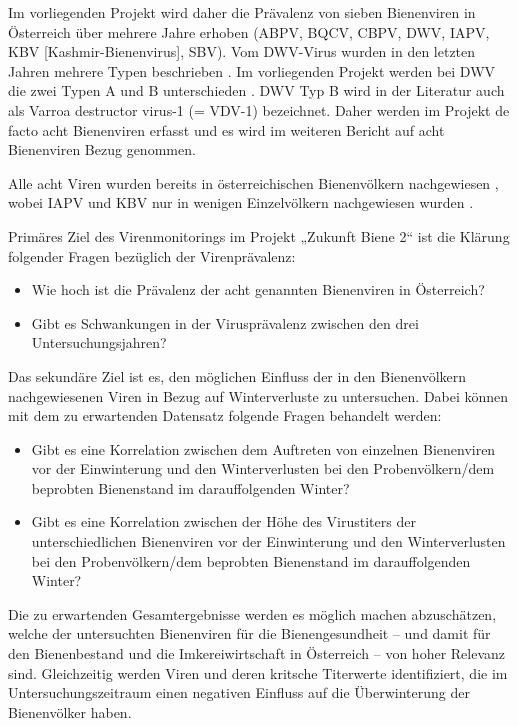 Im vorliegenden Projekt wird daher die Prävalenz von sieben Bienenviren in Österreich über mehrere Jahre erhoben (ABPV, BQCV, CBPV, DWV, IAPV, KBV [Kashmir-Bienenvirus], SBV). Vom DWV-Virus wurden in den letzten Jahren mehrere Typen beschrieben \citep{martin2012,mordecai2016}. Im vorliegenden Projekt werden bei DWV die zwei Typen A und B unterschieden \citep{martin2012}. DWV Typ B wird in der Literatur auch als Varroa destructor virus-1 (= VDV-1) bezeichnet. Daher werden im Projekt de facto acht Bienenviren erfasst und es wird im weiteren Bericht auf acht Bienenviren Bezug genommen.

Alle acht Viren wurden bereits in österreichischen Bienenvölkern nachgewiesen \citep{berenyi2006,girsch2012,köglberger2009,morawetz2018}, wobei IAPV und KBV nur in wenigen Einzelvölkern nachgewiesen wurden \citep{girsch2012}. 

Primäres Ziel des Virenmonitorings im Projekt „Zukunft Biene 2“ ist die Klärung folgender Fragen bezüglich der Virenprävalenz: 

\begin{itemize}
    \item Wie hoch ist die Prävalenz der acht genannten Bienenviren in Österreich? 
    \item Gibt es Schwankungen in der Virusprävalenz zwischen den drei Untersuchungsjahren?
\end{itemize}

Das sekundäre Ziel ist es, den möglichen Einfluss der in den Bienenvölkern nachgewiesenen Viren in Bezug auf Winterverluste zu untersuchen. Dabei können mit dem zu erwartenden Datensatz folgende Fragen behandelt werden: 

\begin{itemize}
    \item Gibt es eine Korrelation zwischen dem Auftreten von einzelnen Bienenviren vor der Einwinterung und den Winterverlusten bei den Probenvölkern/dem beprobten Bienenstand im darauffolgenden Winter? 
    \item Gibt es eine Korrelation zwischen der Höhe des Virustiters der unterschiedlichen Bienenviren vor der Einwinterung und den Winterverlusten bei den Probenvölkern/dem beprobten Bienenstand im darauffolgenden Winter?
\end{itemize}

Die zu erwartenden Gesamtergebnisse werden es möglich machen abzuschätzen, welche der untersuchten Bienenviren für die Bienengesundheit – und damit für den Bienenbestand und die Imkereiwirtschaft in Österreich – von hoher Relevanz sind. Gleichzeitig werden Viren und deren kritsche Titerwerte identifiziert, die im Untersuchungszeitraum einen negativen Einfluss auf die Überwinterung der Bienenvölker haben.
